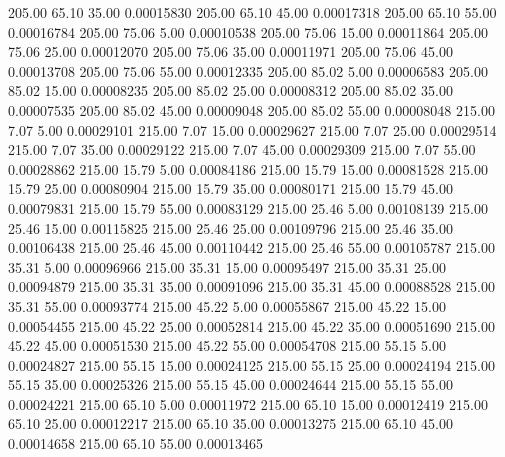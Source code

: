     205.00     65.10     35.00     0.00015830
    205.00     65.10     45.00     0.00017318
    205.00     65.10     55.00     0.00016784
    205.00     75.06      5.00     0.00010538
    205.00     75.06     15.00     0.00011864
    205.00     75.06     25.00     0.00012070
    205.00     75.06     35.00     0.00011971
    205.00     75.06     45.00     0.00013708
    205.00     75.06     55.00     0.00012335
    205.00     85.02      5.00     0.00006583
    205.00     85.02     15.00     0.00008235
    205.00     85.02     25.00     0.00008312
    205.00     85.02     35.00     0.00007535
    205.00     85.02     45.00     0.00009048
    205.00     85.02     55.00     0.00008048
    215.00      7.07      5.00     0.00029101
    215.00      7.07     15.00     0.00029627
    215.00      7.07     25.00     0.00029514
    215.00      7.07     35.00     0.00029122
    215.00      7.07     45.00     0.00029309
    215.00      7.07     55.00     0.00028862
    215.00     15.79      5.00     0.00084186
    215.00     15.79     15.00     0.00081528
    215.00     15.79     25.00     0.00080904
    215.00     15.79     35.00     0.00080171
    215.00     15.79     45.00     0.00079831
    215.00     15.79     55.00     0.00083129
    215.00     25.46      5.00     0.00108139
    215.00     25.46     15.00     0.00115825
    215.00     25.46     25.00     0.00109796
    215.00     25.46     35.00     0.00106438
    215.00     25.46     45.00     0.00110442
    215.00     25.46     55.00     0.00105787
    215.00     35.31      5.00     0.00096966
    215.00     35.31     15.00     0.00095497
    215.00     35.31     25.00     0.00094879
    215.00     35.31     35.00     0.00091096
    215.00     35.31     45.00     0.00088528
    215.00     35.31     55.00     0.00093774
    215.00     45.22      5.00     0.00055867
    215.00     45.22     15.00     0.00054455
    215.00     45.22     25.00     0.00052814
    215.00     45.22     35.00     0.00051690
    215.00     45.22     45.00     0.00051530
    215.00     45.22     55.00     0.00054708
    215.00     55.15      5.00     0.00024827
    215.00     55.15     15.00     0.00024125
    215.00     55.15     25.00     0.00024194
    215.00     55.15     35.00     0.00025326
    215.00     55.15     45.00     0.00024644
    215.00     55.15     55.00     0.00024221
    215.00     65.10      5.00     0.00011972
    215.00     65.10     15.00     0.00012419
    215.00     65.10     25.00     0.00012217
    215.00     65.10     35.00     0.00013275
    215.00     65.10     45.00     0.00014658
    215.00     65.10     55.00     0.00013465
